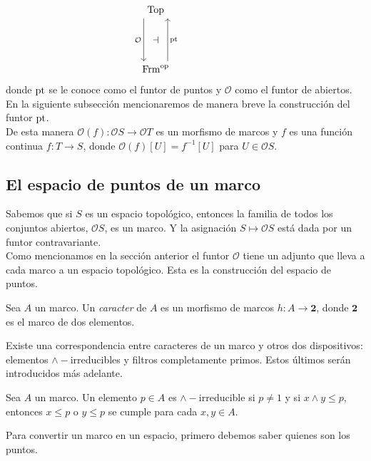 \[\begin{tikzcd}
	{\Top} \\
	{} & {} & {} \\
	{\Frm^{\op}}
	\arrow["{\pt}"{name=0, swap}, from=3-1, to=1-1, shift right=5]
	\arrow["{\mathcal{O}}"{name=1, swap}, from=1-1, to=3-1, shift right=5]
	\arrow["\dashv"{rotate=0}, from=1, to=0, phantom]
\end{tikzcd}\]
donde $\mathrm{pt}$ se le conoce como el funtor de puntos y $\mathcal{O}$ como el funtor de abiertos. En la siguiente subsección mencionaremos de manera breve la construcción del funtor $\mathrm{pt}$.\\

De esta manera $\mathcal{O}(f)\colon \mathcal{O}S\to \mathcal{O}T$ es un morfismo de marcos y $f$ es una función continua $f\colon T\to S$, donde $\mathcal{O}(f)[U]=f^{-1}[U]$ para $U\in \mathcal{O}S$.

\subsection{El espacio de puntos de un marco}\label{Epuntos}

Sabemos que si $S$ es un espacio topológico, entonces la familia de todos los conjuntos abiertos, $\mathcal{O}S$, es un marco. Y la asignación $S\mapsto \mathcal{O}S$ está dada por un funtor contravariante.\\

Como mencionamos en la sección anterior el funtor $\mathcal{O}$ tiene un adjunto que lleva a cada marco a un espacio topológico. Esta es la construcción del espacio de puntos.

\begin{dfn}
    Sea $A$ un marco. Un \emph{caracter} de $A$ es un morfismo de marcos $h\colon A\to \mathbf{2}$, donde $\mathbf{2}$ es el marco de dos elementos.
\end{dfn}

Existe una correspondencia entre caracteres de un marco y otros dos dispositivos: elementos $\wedge-$irreducibles y filtros completamente primos. Estos últimos serán introducidos más adelante.

\begin{dfn}\label{infirre}
    Sea $A$ un marco. Un elemento $p\in A$ es $\wedge-$irreducible si $p\neq 1$ y si $x\wedge y\leq p$, entonces $x\leq p$ o $y\leq p$ se cumple para cada $x, y \in A$.
\end{dfn}

Para convertir un marco en un espacio, primero debemos saber quienes son los puntos.

